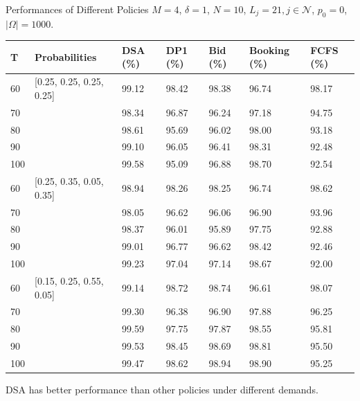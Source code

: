 
    \begin{frame}{Performances of Different Policies}
        \scriptsize
        $M =4$, $\delta =1$, $N =10$, $L_j =21, j \in \mathcal{N}$, $p_0 = 0$, $|\Omega| = 1000$.
        \begin{table}[ht]
          \centering
          \begin{tabular}{|l|l|l|l|l|l|l|}
          \hline
           T & Probabilities & DSA (\%) & DP1 (\%) & Bid (\%) & Booking (\%) & FCFS (\%) \\
          \hline
          60  & [0.25, 0.25, 0.25, 0.25]  & 99.12 & 98.42 & 98.38 & 96.74 & 98.17 \\
          70  &   & 98.34 & 96.87 & 96.24 & 97.18 & 94.75 \\
          80  &   & 98.61 & 95.69 & 96.02 & 98.00 & 93.18 \\
          90  &   & 99.10 & 96.05 & 96.41 & 98.31 & 92.48 \\
          100 &   & 99.58 & 95.09 & 96.88 & 98.70 & 92.54 \\
          \hline
          60  & [0.25, 0.35, 0.05, 0.35]  & 98.94 & 98.26 & 98.25 & 96.74 & 98.62 \\
          70  &   & 98.05 & 96.62 & 96.06 & 96.90 & 93.96 \\
          80  &   & 98.37 & 96.01 & 95.89 & 97.75 & 92.88 \\
          90  &   & 99.01 & 96.77 & 96.62 & 98.42 & 92.46 \\
          100 &   & 99.23 & 97.04 & 97.14 & 98.67 & 92.00 \\
          \hline
          60  & [0.15, 0.25, 0.55, 0.05]  & 99.14 & 98.72 & 98.74 & 96.61 & 98.07 \\
          70  &   & 99.30 & 96.38 & 96.90 & 97.88 & 96.25 \\
          80  &   & 99.59 & 97.75 & 97.87 & 98.55 & 95.81 \\
          90  &   & 99.53 & 98.45 & 98.69 & 98.81 & 95.50 \\
          100 &   & 99.47 & 98.62 & 98.94 & 98.90 & 95.25 \\
          \hline
          \end{tabular}
        \end{table}
        DSA has better performance than other policies under different demands.

    \end{frame}
      
